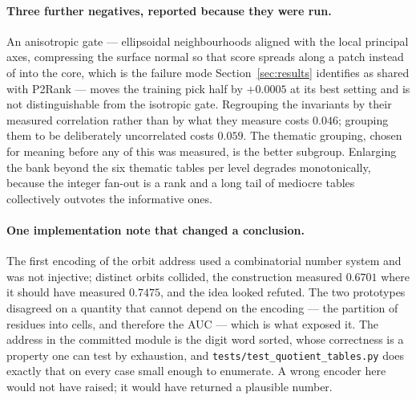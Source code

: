 \documentclass[11pt]{article}
\begin{document}
\paragraph{Three further negatives, reported because they were run.} An
anisotropic gate --- ellipsoidal neighbourhoods aligned with the local principal
axes, compressing the surface normal so that score spreads along a patch instead
of into the core, which is the failure mode Section~\ref{sec:results} identifies
as shared with P2Rank --- moves the training pick half by \(+0.0005\) at its
best setting and is not distinguishable from the isotropic gate. Regrouping the
invariants by their measured correlation rather than by what they measure costs
\(0.046\); grouping them to be deliberately uncorrelated costs \(0.059\). The
thematic grouping, chosen for meaning before any of this was measured, is the
better subgroup. Enlarging the bank beyond the six thematic tables per level
degrades monotonically, because the integer fan-out is a rank and a long tail of
mediocre tables collectively outvotes the informative ones.

\paragraph{One implementation note that changed a conclusion.} The first
encoding of the orbit address used a combinatorial number system and was not
injective; distinct orbits collided, the construction measured \(0.6701\) where
it should have measured \(0.7475\), and the idea looked refuted. The two
prototypes disagreed on a quantity that cannot depend on the encoding --- the
partition of residues into cells, and therefore the AUC --- which is what
exposed it. The address in the committed module is the digit word sorted, whose
correctness is a property one can test by exhaustion, and
\texttt{tests/test\_quotient\_tables.py} does exactly that on every case small
enough to enumerate. A wrong encoder here would not have raised; it would have
returned a plausible number.
\end{document}
